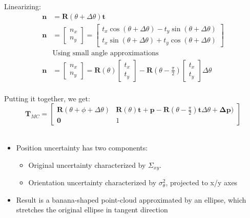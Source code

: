 Linearizing:
\begin{align*}
  \mathbf{n} &= \mathbf{R}(\theta + \Delta \theta)\mathbf{t} \\
  \mathbf{n} & = \begin{bmatrix}n_x \\ n_y \end{bmatrix} =  \begin{bmatrix}t_x\cos(\theta + \Delta \theta) - t_y \sin(\theta + \Delta \theta) \\ t_x\sin(\theta + \Delta \theta) + t_y \cos(\theta + \Delta \theta) \end{bmatrix} \\
            &  \text{Using small angle approximations} \\
  \mathbf{n} & = \begin{bmatrix}n_x \\ n_y \end{bmatrix} =  \mathbf{R}(\theta) \begin{bmatrix} t_x \\ t_y \end{bmatrix} - \mathbf{R}(\theta -\frac{\pi}{2}) \begin{bmatrix} t_x \\ t_y \end{bmatrix} \Delta \theta\\
\end{align*}

Putting it together, we get:
\begin{equation}
  \mathbf{T}_{MC} = \begin{bmatrix} \mathbf{R}(\theta + \phi + \Delta \theta) & \mathbf{R}(\theta) \mathbf{t} + \mathbf{p} - \mathbf{R}(\theta - \frac{\pi}{2})\mathbf{t} \Delta \theta + \mathbf{\Delta p}) \\
                  \mathbf{0} & 1
  \end{bmatrix}
  \label{eq:position uncertainty}
\end{equation}
\\
\begin{itemize}
  \item Position uncertainty has two components:
  \begin{itemize}
    \item Original uncertainty characterized by $\Sigma_{xy}$.
    \item Orientation uncertainty characterized by $\sigma_{\theta}^2$, projected to x/y axes
  \end{itemize}
  \item Result is a banana-shaped point-cloud approximated by an ellipse, which stretches the original ellipse in tangent direction
\end{itemize}

